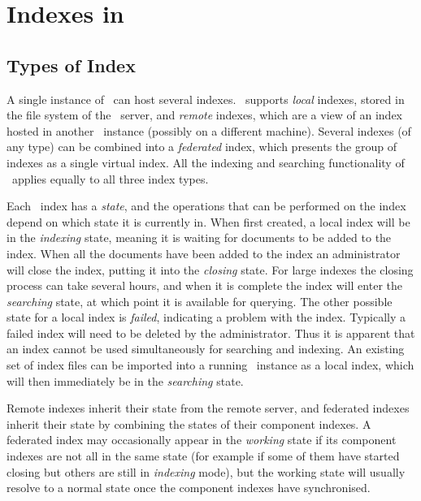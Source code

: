 
\section{Indexes in \Mimir}

\subsection{Types of Index}\label{sec:admin:index-types}

A single instance of \Mimir\ can host several indexes.  \Mimir\ supports
{\em local} indexes, stored in the file system of the \Mimir\ server, and
{\em remote} indexes, which are a view of an index hosted in another \Mimir\
instance (possibly on a different machine).  Several indexes (of any type) can
be combined into a {\em federated} index, which presents the group of indexes as
a single virtual index.  All the indexing and searching functionality of
\Mimir\ applies equally to all three index types.

Each \Mimir\ index has a {\em state}, and the operations that can be performed
on the index depend on which state it is currently in.  When first created, a
local index will be in the {\em indexing} state, meaning it is waiting for
documents to be added to the index.  When all the documents have been added to
the index an administrator will close the index, putting it into the {\em
closing} state.  For large indexes the closing process can take several hours,
and when it is complete the index will enter the {\em searching} state, at
which point it is available for querying.  The other possible state for a local
index is {\em failed}, indicating a problem with the index.  Typically a failed
index will need to be deleted by the administrator.  Thus it is apparent that
an index cannot be used simultaneously for searching and indexing.  An existing
set of index files can be imported into a running \Mimir\ instance as a local
index, which will then immediately be in the {\em searching} state.

Remote indexes inherit their state from the remote server, and federated
indexes inherit their state by combining the states of their component indexes.
A federated index may occasionally appear in the {\em working} state if its
component indexes are not all in the same state (for example if some of them
have started closing but others are still in {\em indexing} mode), but the
working state will usually resolve to a normal state once the component indexes
have synchronised.


